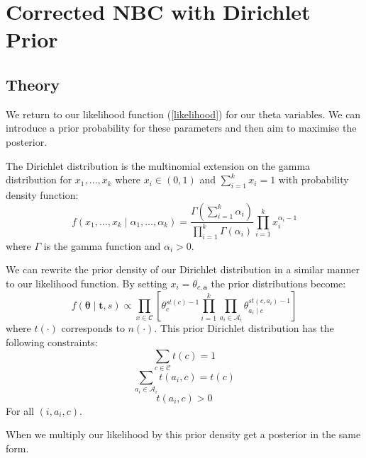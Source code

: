 \chapter{Corrected NBC with Dirichlet Prior}

\section{Theory}

We return to our likelihood function (\ref{likelihood}) for our theta variables. We can introduce a prior probability for these parameters and then aim to maximise the posterior.

The Dirichlet distribution is the multinomial extension on the gamma distribution for $x_1,\dots,x_k$ where $x_i \in (0,1)$ and $\sum_{i=1}^k x_i = 1$ with probability density function:
\begin{equation} \label{dirichlet_pdf}
	f(x_1,\dots,x_k \mid \alpha_1,\dots,\alpha_k) = \frac{\Gamma(\sum_{i=1}^k\alpha_i)}{\prod_{i=1}^k\Gamma(\alpha_i)} \prod_{i=1}^k x_i^{\alpha_i - 1}
\end{equation}
where $\Gamma$ is the gamma function and $\alpha_i > 0$.

We can rewrite the prior density of our Dirichlet distribution in a similar manner to our likelihood function. By setting $x_i = \theta_{c,\mathbf{a}}$ the prior distributions become:
\begin{equation} \label{prior}
	f(\mathbf{\theta} \mid \mathbf{t}, s) \propto \prod_{x \in \mathcal{C}} \left[ \theta_c^{st(c) - 1} \prod_{i=1}^k \prod_{a_i \in \mathcal{A}_i} \theta_{a_i \mid c}^{st(c, a_i) - 1} \right]
\end{equation}
where $t(\cdot)$ corresponds to $n(\cdot)$. This prior Dirichlet distribution \cite{Zaffalon01} has the following constraints:
\begin{equation}
	\sum_{c \in \mathcal{C}} t(c) = 1
\end{equation}
\begin{equation}
	\sum_{a_i \in \mathcal{A}_i} t(a_i, c) = t(c)
\end{equation}
\begin{equation}
	t(a_i, c) > 0
\end{equation}
For all $(i, a_i, c)$.

When we multiply our likelihood by this prior density get a posterior in the same form.